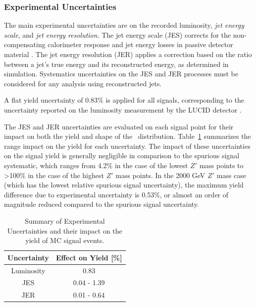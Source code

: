 
\subsubsection{Experimental Uncertainties}
The main experimental uncertainties are on the recorded luminosity, \textit{jet energy scale}, and \textit{jet energy resolution}.
The jet energy scale (JES) corrects for the non-compensating calorimeter response and jet energy losses in passive detector material \cite{jes_jer}.
The jet energy resolution (JER) applies a correction based on the ratio between a jet's true energy and its reconstructed energy, as determined in simulation.
Systematics uncertainties on the JES and JER processes must be considered for any analysis using reconstructed jets.

A flat yield uncertainty of 0.83\% is applied for all signals, corresponding to the uncertainty reported on the luminosity measurement by the LUCID detector \cite{lucid_uncertainty}. 

The JES and JER uncertainties are evaluated on each signal point for their impact on both the yield and shape of the \mt~distribution.
Table~\ref{tab:exp_syst} summarizes the range impact on the yield for each uncertainty.
The impact of these uncertainties on the signal yield is generally negligible in comparison to the spurious signal systematic, which ranges from 4.2\% in the case of the lowest $Z'$ mass points to >100\% in the case of the highest $Z'$ mass points.
In the 2000 GeV $Z'$ mass case (which has the lowest relative spurious signal uncertainty), the maximum yield difference due to experimental uncertainty is 0.53\%, or almost an order of magnitude reduced compared to the spurious signal uncertainty.

\begin{table}
\centering
  \begin{tabular}{ |c|c| }
    \hline
    Uncertainty & Effect on Yield [\%] \\
    \hline
     Luminosity & 0.83 \\
     JES & 0.04 - 1.39 \\
     JER & 0.01 - 0.64 \\
    \hline
  \end{tabular}
  \caption{Summary of Experimental Uncertainties and their impact on the yield of MC signal events.}
  \label{tab:exp_syst}
\end{table}

